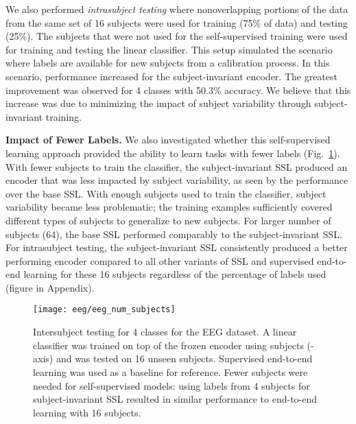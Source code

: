 \documentclass{article}
\renewcommand{\paragraph}[1]{\textbf{#1}\hspace{1em}}
\begin{document}
We also performed \textit{intrasubject testing} where nonoverlapping portions of
the data from the same set of 16 subjects were used for training (75\% of data)
and testing (25\%). The subjects that were not used for the self-supervised
training were used for training and testing the linear classifier. This setup
simulated the scenario where labels are available for new subjects from a
calibration process. In this scenario, performance increased for the
subject-invariant encoder. The greatest improvement was observed for 4 classes
with 50.3\% accuracy. We believe that this increase was due to minimizing the
impact of subject variability through subject-invariant training.

\paragraph{Impact of Fewer Labels.}
We also investigated whether this self-supervised learning approach provided the
ability to learn tasks with fewer labels (Fig.~\ref{fig:eeg:labels}). With fewer
subjects to train the classifier, the subject-invariant SSL produced an encoder
that was less impacted by subject variability, as seen by the performance over
the base SSL. With enough subjects used to train the classifier, subject
variability became less problematic; the training examples sufficiently covered
different types of subjects to generalize to new subjects. For larger number of
subjects (64), the base SSL performed comparably to the subject-invariant
SSL. For intrasubject testing, the subject-invariant SSL consistently produced a
better performing encoder compared to all other variants of SSL and supervised
end-to-end learning for these 16 subjects regardless of the percentage of labels
used (figure in Appendix).

\begin{figure}
  \begin{minipage}[c]{0.49\textwidth}
    \texttt{[image: eeg/eeg\_num\_subjects]}
  \end{minipage}
  \hfill
  \begin{minipage}[c]{0.5\textwidth}
    \caption{Intersubject testing for 4 classes for the EEG dataset. A linear
    classifier was trained on top of the frozen encoder using  subjects
    (-axis) and was tested on 16 unseen subjects. Supervised end-to-end
    learning was used as a baseline for reference. Fewer subjects were needed
    for self-supervised models: using labels from 4 subjects for
    subject-invariant SSL resulted in similar performance to end-to-end learning
    with 16 subjects.}
    \label{fig:eeg:labels}
  \end{minipage}
\end{figure}
\end{document}
